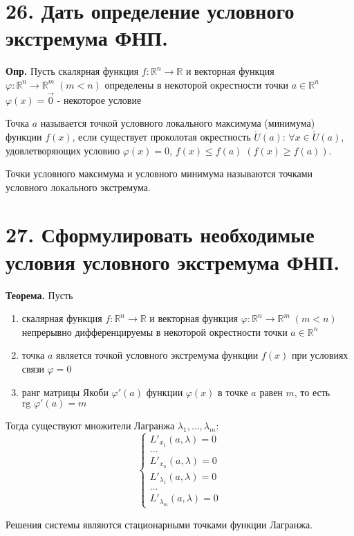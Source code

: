 \documentclass[11pt]{article}
\begin{document}
\section*{26. Дать определение условного экстремума ФНП.}
\par\textbf{Опр.} Пусть скалярная функция $f: \mathbb{R}^{n} \to \mathbb{R}$ и векторная функция $\varphi: \mathbb{R}^{n} \to \mathbb{R}^m \; (m < n)$ определены в некоторой окрестности точки $a \in \mathbb{R}^n$
$\varphi(x) = \vec{0}$ - некоторое условие
\par Точка $a$ называется точкой условного локального максимума (минимума) функции $f(x)$, если существует проколотая окрестность $\mathring{U}(a)$: $\forall x \in \mathring{U}(a)$, удовлетворяющих условию $\varphi(x) = 0$, $f(x) \leq f(a) \; (f(x) \geq f(a))$.
\par Точки условного максимума и условного минимума называются точками условного локального экстремума.
\section*{27. Сформулировать необходимые условия условного экстремума ФНП.}
\par\textbf{Теорема.} Пусть
\begin{enumerate}
    \item  скалярная функция $f: \mathbb{R}^{n} \to \mathbb{R}$ и векторная функция $\varphi: \mathbb{R}^{n} \to \mathbb{R}^m \; (m < n)$ непрерывно дифференцируемы в некоторой окрестности точки $a \in \mathbb{R}^n$
    \item точка $a$ является точкой условного экстремума функции $f(x)$ при условиях связи $\varphi = 0$
    \item ранг матрицы Якоби $\varphi'(a)$ функции $\varphi(x)$ в точке $a$ равен $m$, то есть $\text{rg } \varphi'(a) = m$
\end{enumerate}
\par Тогда существуют множители Лагранжа $\lambda_{1}, \dots, \lambda_{m}$:
$$\left\{\begin{array}{l}
L'_{x_{1}} (a, \lambda) = 0 \\
\dots \\
L'_{x_{n}} (a, \lambda) = 0 \\
L'_{\lambda_{1}} (a, \lambda) = 0 \\
\dots \\
L'_{\lambda_{m}} (a, \lambda) = 0
\end{array}\right.$$
\par Решения системы являются стационарными точками функции Лагранжа.
\end{document}
